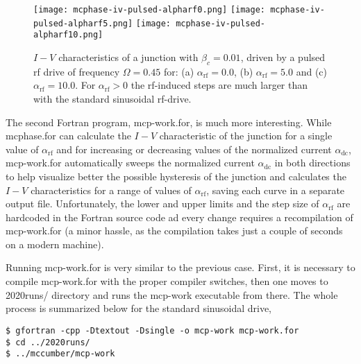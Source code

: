 \begin{figure}[h]
{
	\fboxsep=0pt
	\mbox{\texttt{[image: mcphase-iv-pulsed-alpharf0.png]}}
	\hfill
	\mbox{\texttt{[image: mcphase-iv-pulsed-alpharf5.png]}}
	\hfill
	\mbox{\texttt{[image: mcphase-iv-pulsed-alpharf10.png]}}
}
	\caption{$I - V$ characteristics of a junction with $\beta_c = 0.01$, driven by a pulsed rf drive of frequency $\Omega = 0.45$ for: (a) $\alpha_\mathrm{rf} = 0.0$, (b) $\alpha_\mathrm{rf} = 5.0$ and (c) $\alpha_\mathrm{rf} = 10.0$. For $\alpha_\mathrm{rf} > 0$ the rf-induced steps are much larger than with the standard sinusoidal rf-drive.}
	\label{fig:mcphase-iv-pulsed}
\end{figure}


The second Fortran program, \textsf{mcp-work.for}, is much more interesting. While \textsf{mcphase.for} can calculate the $I - V$ characteristic of the junction for a single value of $\alpha_\mathrm{rf}$ and for increasing or decreasing values of the normalized current $\alpha_\mathrm{dc}$, \textsf{mcp-work.for} automatically sweeps the normalized current $\alpha_\mathrm{dc}$ in both directions to help visualize better the possible hysteresis of the junction and calculates the $I - V$ characteristics for a range of values of $\alpha_\mathrm{rf}$, saving each curve in a separate output file. Unfortunately, the lower and upper limits and the step size of $\alpha_\mathrm{rf}$ are hardcoded in the Fortran source code ad every change requires a recompilation of \textsf{mcp-work.for} (a minor hassle, as the compilation takes just a couple of seconds on a modern machine).


Running \textsf{mcp-work.for} is very similar to the previous case. First, it is necessary to compile \textsf{mcp-work.for} with the proper compiler switches, then one moves to \textsf{2020runs/} directory and runs the \textsf{mcp-work} executable from there. The whole process is summarized below for the standard sinusoidal drive,

\begin{lstlisting}
$ gfortran -cpp -Dtextout -Dsingle -o mcp-work mcp-work.for
$ cd ../2020runs/
$ ../mccumber/mcp-work
\end{lstlisting}

